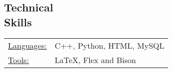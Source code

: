 \documentclass[margin]{res}
\begin{document}
\begin{resume}
\section{Technical \\ Skills}
   \begin{tabular}{l p{3in}}
    \underline{Languages:} & C++, Python, HTML, MySQL \\

     \underline{Tools:} &  \LaTeX, Flex and Bison
 \end{tabular}

\end{resume} 
\end{document}
